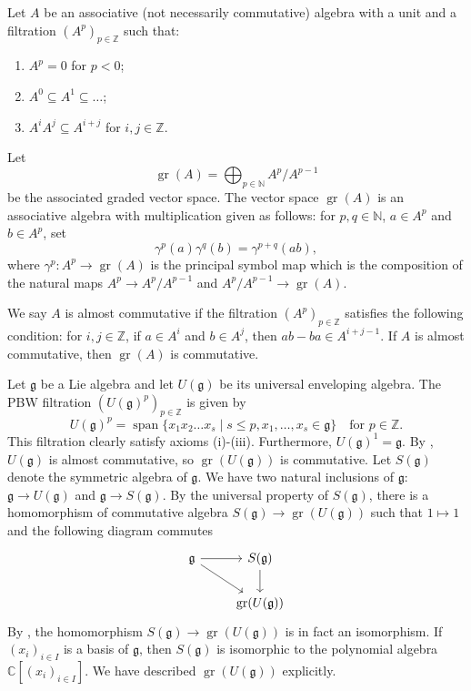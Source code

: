 \documentclass[a4paper, 12pt, reqno]{amsart}
\theoremstyle{remark}
\numberwithin{equation}{subsection}
\DeclareMathOperator{\gr}{gr}
\DeclareMathOperator{\vspan}{span}
\begin{document}
Let $A$ be an associative (not necessarily commutative) algebra with a unit and a filtration $(A^p)_{p \in \mathbb{Z}}$ such that:
\begin{enumerate}
\item $A^p = 0$ for $p < 0$;
\item $A^0 \subseteq A^1 \subseteq \dots$;
\item $A^iA^j \subseteq A^{i + j}$ for $i, j \in \mathbb{Z}$.
\end{enumerate}
Let
\begin{equation*}
  \gr(A) = \bigoplus_{p \in \mathbb{N}}A^p/A^{p - 1}
\end{equation*}
be the associated graded vector space.
The vector space $\gr(A)$ is an associative algebra with multiplication given as follows: for $p, q \in \mathbb{N}$, $a \in A^p$ and $b \in A^p$, set
\begin{equation*}
  \gamma^p(a)\gamma^q(b) = \gamma^{p + q}(ab),
\end{equation*}
where $\gamma^p: A^p \to \gr(A)$  is the principal symbol map which is the composition of the natural maps $A^p \to A^p/A^{p - 1}$ and $A^p/A^{p - 1} \to \gr(A)$.

We say $A$ is almost commutative if the filtration $(A^p)_{p \in \mathbb{Z}}$ satisfies the following condition: for $i, j \in \mathbb{Z}$, if $a \in A^i$ and $b \in A^j$, then $ab - ba \in A^{i + j -1}$.
If $A$ is almost commutative, then $\gr(A)$ is commutative.

Let $\mathfrak{g}$ be a Lie algebra and let $U(\mathfrak{g})$ be its universal enveloping algebra.
The PBW filtration $(U(\mathfrak{g})^p)_{p \in \mathbb{Z}}$ is given by
\begin{equation*}
  U(\mathfrak{g})^p = \vspan\{x_1x_2\dots x_s \mid s\le p, x_1, \dots, x_s \in \mathfrak{g}\} \quad \text{for }p \in \mathbb{Z}.
\end{equation*}
This filtration clearly satisfy axioms (i)-(iii).
Furthermore, $U(\mathfrak{g})^1 = \mathfrak{g}$.
By \cite[2.1.5. Lemma.]{dixmier_enveloping_1996}, $U(\mathfrak{g})$ is almost commutative, so $\gr(U(\mathfrak{g}))$ is commutative.
Let $S(\mathfrak{g})$ denote the symmetric algebra of $\mathfrak{g}$.
We have two natural inclusions of $\mathfrak{g}$: $\mathfrak{g} \to U(\mathfrak{g})$ and $\mathfrak{g} \to S(\mathfrak{g})$.
By the universal property of $S(\mathfrak{g})$, there is a homomorphism of commutative algebra $S(\mathfrak{g}) \to \gr(U(\mathfrak{g}))$ such that $1 \mapsto 1$ and the following diagram commutes
\begin{equation*}
  \begin{tikzcd}
    \mathfrak{g} \arrow[r] \arrow[rd] & S(\mathfrak{g}) \arrow[d] \\
    & \gr(U(\mathfrak{g}))      
  \end{tikzcd}
\end{equation*}
By \cite[2.3.6. Proposition]{dixmier_enveloping_1996}, the homomorphism $S(\mathfrak{g}) \to \gr(U(\mathfrak{g}))$ is in fact an isomorphism.
If $(x_i)_{i \in I}$ is a basis of $\mathfrak{g}$, then $S(\mathfrak{g})$ is isomorphic to the polynomial algebra $\mathbb{C}[(x_i)_{i \in I}]$.
We have described $\gr(U(\mathfrak{g}))$ explicitly.




\end{document}
